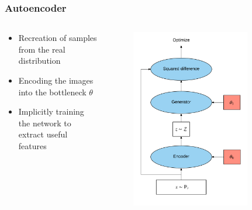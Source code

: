 \documentclass{Bredelebeamer}
\begin{document}

\begin{frame}
\frametitle{Autoencoder}
\begin{columns}
\begin{column}{0.5\textwidth}
\begin{itemize}
	\item Recreation of samples from the real distribution
	\item Encoding the images into the bottleneck $\theta$
	\item Implicitly training the network to extract useful features
\end{itemize}
\end{column}
\begin{column}{0.5\textwidth}
\begin{figure}[h!]
	\centering
	\includegraphics[width=0.8\textwidth]{autoencoder_attempt.png}
\end{figure}
\end{column}
\end{columns}

\end{frame}
\end{document}
